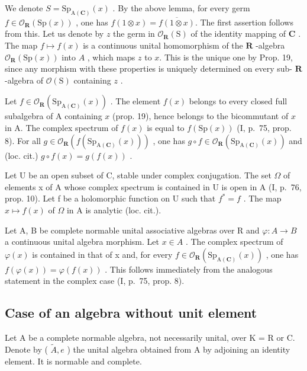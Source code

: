 We denote \(S = \text{Sp}_{\text{A}(\mathbf{C})}(x)\) . By the above lemma, for every germ \(f \in \mathcal{O}_{\mathbf{R}}(\text{Sp}(x))\) , one has \(f(1 \otimes x) = \overline{f(1 \otimes x)}\). The first assertion follows from this. Let us denote by \(z\) the germ in \(\mathcal{O}_{\mathbf{R}}(\text{S})\) of the identity mapping of \(\mathbf{C}\) . The map \(f \mapsto f(x)\) is a continuous unital homomorphism of the \(\mathbf{R}\) -algebra \(\mathcal{O}_{\mathbf{R}}(\text{Sp}(x))\) into \(A\) , which maps \(z\) to \(x\). This is the unique one by Prop. 19, since any morphism with these properties is uniquely determined on every sub- \(\mathbf{R}\) -algebra of \(\mathcal{O}(\text{S})\) containing \(z\) .

Let \(f \in \mathcal{O}_{\mathbf{R}}(\mathrm{Sp}_{\mathrm{A}(\mathbf{C})}(x))\) . The element \(f(x)\) belongs to every closed full subalgebra of A containing \(x\) (prop. 19), hence belongs to the bicommutant of \(x\) in A. The complex spectrum of \(f(x)\) is equal to \(f(\mathrm{Sp}(x))\) (I, p.~75, prop. 8). For all \(g \in \mathcal{O}_{\mathbf{R}}(f(\mathrm{Sp}_{\mathrm{A}(\mathbf{C})}(x)))\) , one has \(g \circ f \in \mathcal{O}_{\mathbf{R}}(\mathrm{Sp}_{\mathrm{A}(\mathbf{C})}(x))\) and (loc. cit.) \(g \circ f(x) = g(f(x))\) .

Let U be an open subset of C, stable under complex conjugation. The set \(\Omega\) of elements x of A whose complex spectrum is contained in U is open in A (I, p.~76, prop. 10). Let f be a holomorphic function on U such that \(f^{*} = f\) . The map \(x \mapsto f(x)\) of \(\Omega\) in A is analytic (loc. cit.).

Let A, B be complete normable unital associative algebras over R and \(\varphi\colon A\to B\) a continuous unital algebra morphism. Let \(x\in A\) . The complex spectrum of \(\varphi(x)\) is contained in that of x and, for every \(f\in\mathcal{O}_{\mathbf{R}}(\mathrm{Sp}_{\mathrm{A}(\mathbf{C})}(x))\) , one has \(f(\varphi(x))=\varphi(f(x))\) . This follows immediately from the analogous statement in the complex case (I, p.~75, prop. 8).

\subsection{Case of an algebra without unit element}

Let A be a complete normable algebra, not necessarily unital, over K = R or C. Denote by ( \(\widetilde{A}, e\) ) the unital algebra obtained from A by adjoining an identity element. It is normable and complete.


